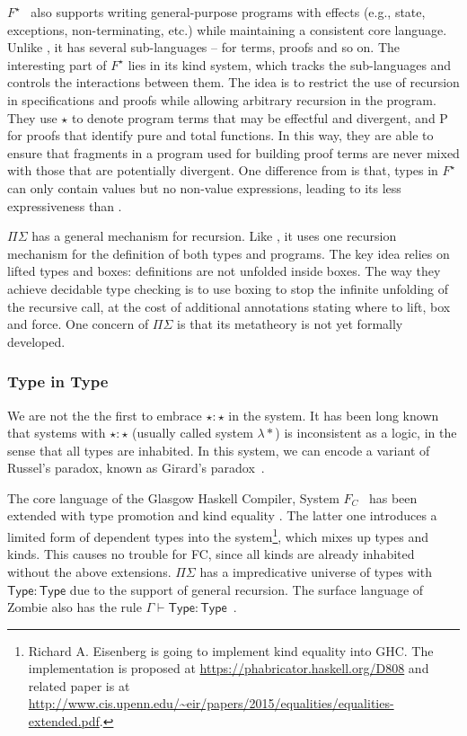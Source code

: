 $F^{\star}$~\cite{Swamy2011} also supports writing general-purpose
programs with effects (e.g., state, exceptions, non-terminating, etc.)
while maintaining a consistent core language. Unlike \name, it has
several sub-languages -- for terms, proofs and so on. The interesting
part of $F^{\star}$ lies in its kind system, which tracks the
sub-languages and controls the interactions between them. The idea is
to restrict the use of recursion in specifications and proofs while
allowing arbitrary recursion in the program. They use $\star$ to
denote program terms that may be effectful and divergent, and
\textsf{P} for proofs that identify pure and total functions. In this
way, they are able to ensure that fragments in a program used for
building proof terms are never mixed with those that are potentially
divergent. One difference from \name is that, types in $F^{\star}$ can
only contain values but no non-value expressions, leading to its less
expressiveness than \name.

$\Pi\Sigma$ has a general mechanism for recursion. Like \name, it uses
one recursion mechanism for the definition of both types and
programs. The key idea relies on lifted types and boxes: definitions
are not unfolded inside boxes. The way they achieve decidable type
checking is to use boxing to stop the infinite unfolding of the
recursive call, at the cost of additional annotations stating where to
lift, box and force. One concern of $\Pi\Sigma$ is that its metatheory
is not yet formally developed.

\subsubsection{Type in Type}

We are not the the first to embrace $\star : \star$ in the system. It
has been long known that systems with $\star : \star$ (usually called
system $\lambda *$) is inconsistent as a logic, in the sense that all
types are inhabited. In this system, we can encode a variant of
Russel's paradox, known as Girard's
paradox~\cite{coquand1986analysis}.

The core language of the Glasgow Haskell Compiler, System $F_{C}$~\cite{fc}
has been extended with type promotion \cite{fc:pro} and kind equality
\cite{fc:kind}. The latter one introduces a limited form of dependent
types into the system\footnote{Richard A. Eisenberg is going to
  implement kind equality \cite{fc:kind} into GHC. The implementation
  is proposed at \url{https://phabricator.haskell.org/D808} and
  related paper is at
  \url{http://www.cis.upenn.edu/~eir/papers/2015/equalities/equalities-extended.pdf}.},
which mixes up types and kinds. This causes no trouble for FC, since
all kinds are already inhabited without the above
extensions. $\Pi\Sigma$ has a impredicative universe of types with
$\mathsf{Type} : \mathsf{Type}$ due to the support of general
recursion. The surface language of Zombie also has the rule
$\Gamma \vdash \mathsf{Type} : \mathsf{Type}$~\cite{zombie:popl15}.

